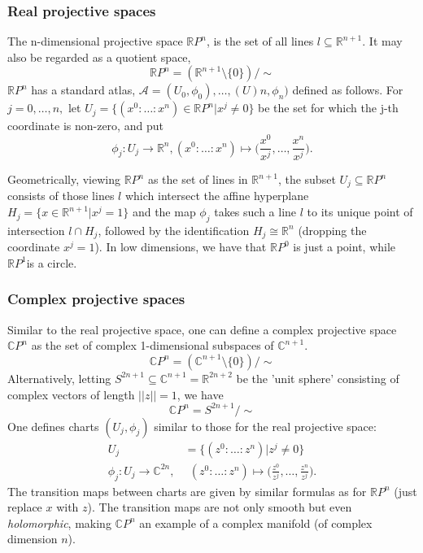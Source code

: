 \documentclass{article}
\theoremstyle{definition}
\begin{document}
\subsubsection{Real projective spaces}

The n-dimensional projective space $\mathbb R P^n$, is the set of all lines $l \subseteq \mathbb R^{n+1}$. It may also be regarded as a quotient space,
\[
\mathbb R P^n  = (\mathbb R^{n+1} \setminus \{0\}) / \sim
\]
$\mathbb R P^n$ has a standard atlas, $\mathscr{A} =  {(U_0,\phi_0),\dots,(U)n,\phi_n)}$ defined as follows. For $j = 0,\dots,n,$ let $U_j = \{(x^0 : \dots : x^n) \in \mathbb R P^n | x^j \neq 0\}$ be the set for which the j-th coordinate is non-zero, and put 
\[
\phi_j : U_j \rightarrow \mathbb R^n, (x^0 : \dots : x^n ) \mapsto \bigg ( \frac{x^0}{x^j} ,\dots, \frac{x^n}{x^j} \bigg).
\]

Geometrically, viewing $\mathbb RP^n$ as the set of lines in $\mathbb R^{n+1}$, the subset $U_j \subseteq \mathbb RP^n$ consists of those lines $l$ which intersect the affine hyperplane $H_j = \{x \in \mathbb R^{n+1} | x^j = 1\}$ and the map $\phi_j$ takes such a line $l$ to its unique point of intersection $l \cap H_j$, followed
by the identification $H_j \cong  \mathbb R^n$ (dropping the coordinate $x^j = 1$). In low dimensions, we have that $\mathbb RP^0$ is just a point, while $\mathbb RP^1$is a circle.

\subsubsection{Complex projective spaces}

Similar to the real projective space, one can define a complex projective space $\mathbb C P^n$ as the set of complex 1-dimensional subspaces of $\mathbb C^{n+1}$.
\[
    \mathbb C P^n = (\mathbb C^{n+1} \setminus \{0\})/ \sim
\]
Alternatively, letting $S^{2n+1} \subseteq \mathbb C^{n+1} = \mathbb R^{2n+2}$ be the 'unit sphere' consisting of complex vectors of length $||z|| = 1$, we have
\[
 \mathbb C P^n = S^{2n+1} / \sim
\]
One defines charts $(U_j ,\phi_j)$ similar to those for the real projective space:
\begin{align*}
    U_j &= \{(z^0 : \dots : z^n) | z^j \neq 0\} \\
    \phi_j : U_j \rightarrow \mathbb C^{2n},& \ \ (z^0 : \dots : z^n ) \mapsto \bigg ( \frac{z^0}{z^j} ,\dots, \frac{z^n}{z^j} \bigg).
\end{align*}
The transition maps between charts are given by similar formulas as for $\mathbb RP^n$ (just replace $x$ with $z$).  The transition maps are not only smooth but even \textit{holomorphic}, making $\mathbb C P^n$ an example of a complex manifold (of complex dimension $n$).
\end{document}
